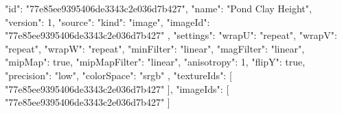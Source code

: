 {
  "id": "77e85ee9395406de3343c2e036d7b427",
  "name": "Pond Clay Height",
  "version": 1,
  "source": {
    "kind": "image",
    "imageId": "77e85ee9395406de3343c2e036d7b427"
  },
  "settings": {
    "wrapU": "repeat",
    "wrapV": "repeat",
    "wrapW": "repeat",
    "minFilter": "linear",
    "magFilter": "linear",
    "mipMap": true,
    "mipMapFilter": "linear",
    "anisotropy": 1,
    "flipY": true,
    "precision": "low",
    "colorSpace": "srgb"
  },
  "textureIds": [
    "77e85ee9395406de3343c2e036d7b427"
  ],
  "imageIds": [
    "77e85ee9395406de3343c2e036d7b427"
  ]
}
